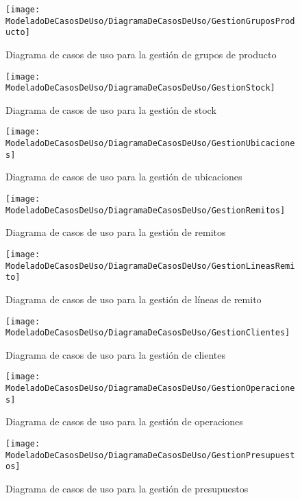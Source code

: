     \begin{figure}[H]
		\centering
		\texttt{[image: ModeladoDeCasosDeUso/DiagramaDeCasosDeUso/GestionGruposProducto]}
		\caption{Diagrama de casos de uso para la gestión de grupos de producto}
	\label{fig:GestionGruposProducto}
	\end{figure}
	\begin{figure}[H]
		\centering
		\texttt{[image: ModeladoDeCasosDeUso/DiagramaDeCasosDeUso/GestionStock]}
		\caption{Diagrama de casos de uso para la gestión de stock}
	\label{fig:GestionStock}
	\end{figure}
	\begin{figure}[H]
		\centering
		\texttt{[image: ModeladoDeCasosDeUso/DiagramaDeCasosDeUso/GestionUbicaciones]}
		\caption{Diagrama de casos de uso para la gestión de ubicaciones}
	\label{fig:GestionUbicaciones}
    \end{figure}
	\begin{figure}[H]
		\centering
		\texttt{[image: ModeladoDeCasosDeUso/DiagramaDeCasosDeUso/GestionRemitos]}
		\caption{Diagrama de casos de uso para la gestión de remitos}
	\label{fig:GestionRemitos}
	\end{figure}
	\begin{figure}[H]
		\centering
		\texttt{[image: ModeladoDeCasosDeUso/DiagramaDeCasosDeUso/GestionLineasRemito]}
		\caption{Diagrama de casos de uso para la gestión de líneas de remito}
	\label{fig:GestionLineasRemito}
    \end{figure}
    \begin{figure}[H]
		\centering
		\texttt{[image: ModeladoDeCasosDeUso/DiagramaDeCasosDeUso/GestionClientes]}
		\caption{Diagrama de casos de uso para la gestión de clientes}
	\label{fig:GestionClientes}
	\end{figure}
	\begin{figure}[H]
		\centering
		\texttt{[image: ModeladoDeCasosDeUso/DiagramaDeCasosDeUso/GestionOperaciones]}
		\caption{Diagrama de casos de uso para la gestión de operaciones}
	\label{fig:GestionOperaciones}
	\end{figure}
    \begin{figure}[H]
		\centering
		\texttt{[image: ModeladoDeCasosDeUso/DiagramaDeCasosDeUso/GestionPresupuestos]}
		\caption{Diagrama de casos de uso para la gestión de presupuestos}
	\label{fig:GestionPresupuestos}
    \end{figure}
